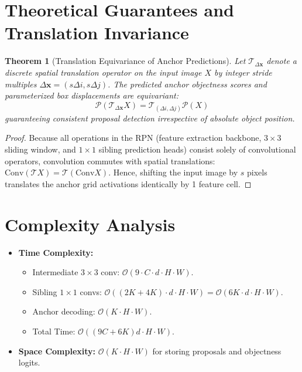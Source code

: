 \documentclass[11pt,a4paper]{article}
\newtheorem{theorem}{Theorem}
\theoremstyle{definition}
\begin{document}
\section{Theoretical Guarantees and Translation Invariance}

\begin{theorem}[Translation Equivariance of Anchor Predictions]
\label{thm:translation_invariance}
Let $\mathcal{T}_{\Delta \mathbf{x}}$ denote a discrete spatial translation operator on the input image $X$ by integer stride multiples $\Delta \mathbf{x} = (s \Delta i, s \Delta j)$. The predicted anchor objectness scores and parameterized box displacements are equivariant:
\begin{equation}
\mathcal{P}(\mathcal{T}_{\Delta \mathbf{x}} X) = \mathcal{T}_{(\Delta i, \Delta j)} \mathcal{P}(X)
\end{equation}
guaranteeing consistent proposal detection irrespective of absolute object position.
\end{theorem}

\begin{proof}
Because all operations in the RPN (feature extraction backbone, $3 \times 3$ sliding window, and $1 \times 1$ sibling prediction heads) consist solely of convolutional operators, convolution commutes with spatial translations: $\text{Conv}(\mathcal{T} X) = \mathcal{T}(\text{Conv} X)$. Hence, shifting the input image by $s$ pixels translates the anchor grid activations identically by 1 feature cell.
\end{proof}

\section{Complexity Analysis}

\begin{itemize}
    \item \textbf{Time Complexity:}
    \begin{itemize}
        \item Intermediate $3 \times 3$ conv: $\mathcal{O}(9 \cdot C \cdot d \cdot H \cdot W)$.
        \item Sibling $1 \times 1$ convs: $\mathcal{O}((2K + 4K) \cdot d \cdot H \cdot W) = \mathcal{O}(6K \cdot d \cdot H \cdot W)$.
        \item Anchor decoding: $\mathcal{O}(K \cdot H \cdot W)$.
        \item Total Time: $\mathcal{O}((9C + 6K) d \cdot H \cdot W)$.
    \end{itemize}
    \item \textbf{Space Complexity:} $\mathcal{O}(K \cdot H \cdot W)$ for storing proposals and objectness logits.
\end{itemize}
\end{document}
